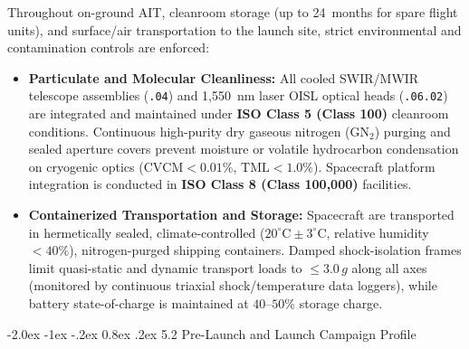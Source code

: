 \documentclass[11pt,a4paper]{article}
\makeatletter
\renewcommand\subsubsection{\@startsection{subsubsection}{3}{\z@}%
    {-2.0ex \@plus -1ex \@minus -.2ex}%
    {0.8ex \@plus .2ex}%
    {\normalfont\normalsize\bfseries\sffamily\color{SubHeadingBlue}}}
\providecommand{\abbr}[1]{#1}
\makeatother
\begin{document}
Throughout on-ground \abbr{AIT}, cleanroom storage (up to 24~months for spare flight units), and surface/air transportation to the launch site, strict environmental and contamination controls are enforced:
\begin{itemize}
    \item \textbf{Particulate and Molecular Cleanliness:} All cooled \abbr{SWIR}/\abbr{MWIR} telescope assemblies (\texttt{.04}) and 1,550~nm laser \abbr{OISL} optical heads (\texttt{.06.02}) are integrated and maintained under \textbf{ISO Class 5 (Class 100)} cleanroom conditions. Continuous high-purity dry gaseous nitrogen ($\mathrm{GN_2}$) purging and sealed aperture covers prevent moisture or volatile hydrocarbon condensation on cryogenic optics ($\mathrm{CVCM} < 0.01\%$, $\mathrm{TML} < 1.0\%$). Spacecraft platform integration is conducted in \textbf{ISO Class 8 (Class 100,000)} facilities.
    \item \textbf{Containerized Transportation and Storage:} Spacecraft are transported in hermetically sealed, climate-controlled ($20^\circ\mathrm{C} \pm 3^\circ\mathrm{C}$, relative humidity $< 40\%$), nitrogen-purged shipping containers. Damped shock-isolation frames limit quasi-static and dynamic transport loads to $\le 3.0\,g$ along all axes (monitored by continuous triaxial shock/temperature data loggers), while battery state-of-charge is maintained at $40\text{--}50\%$ storage charge.
\end{itemize}

\subsubsection{5.2 Pre-Launch and Launch Campaign Profile}
\end{document}
